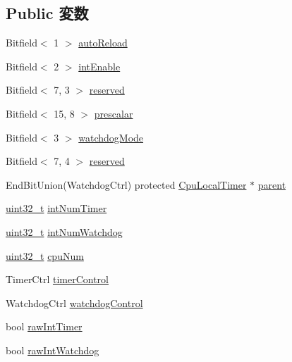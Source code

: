 \subsection*{Public 変数}
\begin{DoxyCompactItemize}
\item 
Bitfield$<$ 1 $>$ \hyperlink{classCpuLocalTimer_1_1Timer_af2069279e2e43fd85f34f715adebf04f}{autoReload}
\item 
Bitfield$<$ 2 $>$ \hyperlink{classCpuLocalTimer_1_1Timer_afb07a713bfa971861404c19f9563279a}{intEnable}
\item 
Bitfield$<$ 7, 3 $>$ \hyperlink{classCpuLocalTimer_1_1Timer_a39eaeaf2a0051b75fa1583c0b5c156a0}{reserved}
\item 
Bitfield$<$ 15, 8 $>$ \hyperlink{classCpuLocalTimer_1_1Timer_af8a4a2ed9062ccf29845771bd30398a4}{prescalar}
\item 
Bitfield$<$ 3 $>$ \hyperlink{classCpuLocalTimer_1_1Timer_abe0a1c55d5d90dbe169c060ef1cfb9a1}{watchdogMode}
\item 
Bitfield$<$ 7, 4 $>$ \hyperlink{classCpuLocalTimer_1_1Timer_a6df0c214646b1e43905ffbeea4e8d438}{reserved}
\item 
EndBitUnion(WatchdogCtrl) protected \hyperlink{classCpuLocalTimer}{CpuLocalTimer} $\ast$ \hyperlink{classCpuLocalTimer_1_1Timer_a91fc2d2ffb2ff7ef97b6aed0a032ba23}{parent}
\item 
\hyperlink{Type_8hh_a435d1572bf3f880d55459d9805097f62}{uint32\_\-t} \hyperlink{classCpuLocalTimer_1_1Timer_a1e2451c323e162d521f8538f07983f06}{intNumTimer}
\item 
\hyperlink{Type_8hh_a435d1572bf3f880d55459d9805097f62}{uint32\_\-t} \hyperlink{classCpuLocalTimer_1_1Timer_a7be8312de67b0bdb2313091b3ece8d63}{intNumWatchdog}
\item 
\hyperlink{Type_8hh_a435d1572bf3f880d55459d9805097f62}{uint32\_\-t} \hyperlink{classCpuLocalTimer_1_1Timer_a8cf4cb95ac9b99db5f9990d16cd6593b}{cpuNum}
\item 
TimerCtrl \hyperlink{classCpuLocalTimer_1_1Timer_a8a303fd4c61e6f2ad203b3996137bf29}{timerControl}
\item 
WatchdogCtrl \hyperlink{classCpuLocalTimer_1_1Timer_a650e1bd041426285d219374bb934b21d}{watchdogControl}
\item 
bool \hyperlink{classCpuLocalTimer_1_1Timer_acae15a5a0ab8900fb06f11e079cf6de2}{rawIntTimer}
\item 
bool \hyperlink{classCpuLocalTimer_1_1Timer_aa79f4b5f49e12748ddccff650ac434d2}{rawIntWatchdog}
\item 

\end{DoxyCompactItemize}
